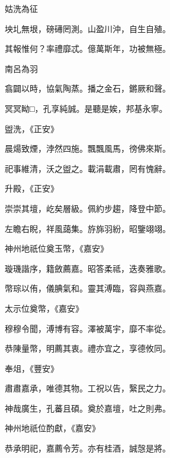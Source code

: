 \begin{pinyinscope}
 姑洗為征



 坱圠無垠，磅礡罔測。山盈川沖，自生自殖。



 其報惟何？率禮靡忒。億萬斯年，功被無極。



 南呂為羽



 翕闢以時，協氣陶蒸。播之金石，鏘厥和聲。



 冥冥眑□，孔享純誠。是聽是娭，邦基永寧。



 盥洗，《正安》



 晨煬致煙，浡然四施。飄飄風馬，徬佛來斯。



 祀事維清，沃之盥之。載涓載肅，罔有愧辭。



 升殿，《正安》



 崇崇其壇，屹矣層級。佩約步趨，降登中節。



 左瞻右睨，祥風藹集。斿旆羽紛，昭鑒翊翊。



 神州地祇位奠玉幣，《嘉安》



 璇璣諧序，籍斂薦嘉。昭答柔祗，迭奏雅歌。



 幣琮以侑，儀腆氣和。靈其溥臨，容與燕嘉。



 太示位奠幣，《嘉安》



 穆穆令聞，溥博有容。澤被萬宇，靡不率從。



 恭陳量幣，明薦其衷。禮亦宜之，享德攸同。



 奉俎，《豐安》



 肅肅嘉承，唯德其物。工祝以告，繄民之力。



 神哉廣生，孔蕃且碩。奠於嘉壇，吐之則弗。



 神州地祇位酌獻，《嘉安》



 恭承明祀，嘉薦令芳。亦有桂酒，誠愨是將。




\end{pinyinscope}
